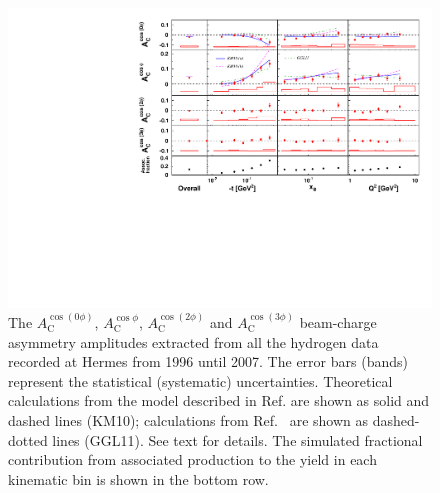 \begin{figure}
  \begin{center}
    \includegraphics[width=15cm]{bca_comb}
    \caption{The $A_{\textrm{C}}^{\cos(0\phi)}$, $A_{\textrm{C}}^{\cos\phi}$, $A_{\textrm{C}}^{\cos(2\phi)}$ and $A_{\textrm{C}}^{\cos(3\phi)}$ beam-charge asymmetry amplitudes extracted from all the hydrogen data recorded at H{\sc ermes} from 1996 until 2007. The error bars (bands) represent the statistical (systematic) uncertainties.  Theoretical calculations from the model described in Ref. \cite{Kum09} are shown as solid and dashed lines (KM10); calculations from Ref.~\cite{Liu11} are shown as dashed-dotted lines (GGL11). See text for details. The simulated fractional contribution from associated production to the yield in each kinematic bin is shown in the bottom row.}
  \label{bca_xbjrange}
 \end{center}
\end{figure}

